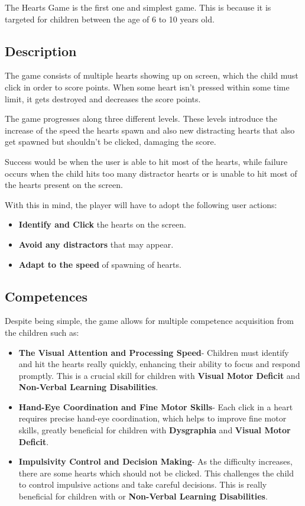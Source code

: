 The Hearts Game is the first one and simplest game. This is because it is targeted for children between the age of 6 to 10 years old.

\subsection*{Description}
The game consists of multiple hearts showing up on screen, which the child must click in order to score points. When some heart isn't pressed within some time limit, it gets destroyed and decreases the score points.

The game progresses along three different levels. These levels introduce the increase of the speed the hearts spawn and also new distracting hearts that also get spawned but shouldn't be clicked, damaging the score.

Success would be when the user is able to hit most of the hearts, while failure occurs when the child hits too many distractor hearts or is unable to hit most of the hearts present on the screen.

With this in mind, the player will have to adopt the following user actions:

\begin{itemize}
    \item \textbf{Identify and Click} the hearts on the screen.
    \item \textbf{Avoid any distractors} that may appear.
    \item \textbf{Adapt to the speed} of spawning of hearts.
\end{itemize}

\subsection*{Competences}
Despite being simple, the game allows for multiple competence acquisition from the children such as:

\begin{itemize}
    \item \textbf{The Visual Attention and Processing Speed}- Children must identify and hit the hearts really quickly, enhancing their ability to focus and respond promptly. This is a crucial skill for children with \textbf{Visual Motor Deficit} and \textbf{Non-Verbal Learning Disabilities}.
    \item \textbf{Hand-Eye Coordination and Fine Motor Skills}- Each click in a heart requires precise hand-eye coordination, which helps to improve fine motor skills, greatly beneficial for children with \textbf{Dysgraphia} and \textbf{Visual Motor Deficit}.
    \item \textbf{Impulsivity Control and Decision Making}- As the difficulty increases, there are some hearts which should not be clicked. This challenges the child to control impulsive actions and take careful decisions. This is really beneficial for children with or \textbf{Non-Verbal Learning Disabilities}.
    
\end{itemize}


